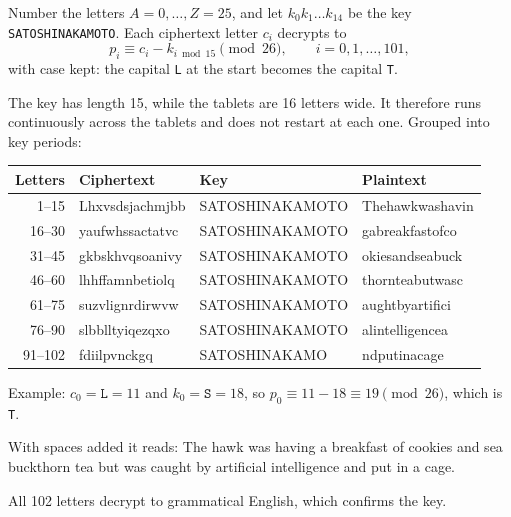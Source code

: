\documentclass[11pt,a4paper]{article}
\newcommand{\tx}[1]{\texttt{#1}}
\begin{document}
Number the letters $A=0,\dots,Z=25$, and let $k_0k_1\dots k_{14}$ be the key
\tx{SATOSHINAKAMOTO}. Each ciphertext letter $c_i$ decrypts to
\[
p_i \equiv c_i - k_{i \bmod 15} \pmod{26}, \qquad i=0,1,\dots,101,
\]
with case kept: the capital \tx{L} at the start becomes the capital \tx{T}.

The key has length 15, while the tablets are 16 letters wide. It therefore
runs continuously across the tablets and does not restart at each one.
Grouped into key periods:

\begin{center}
\renewcommand{\arraystretch}{1.15}
\begin{tabular}{@{}r>{\ttfamily}l>{\ttfamily}l>{\ttfamily}l@{}}
\toprule
Letters & \normalfont Ciphertext & \normalfont Key & \normalfont Plaintext \\
\midrule
1--15   & Lhxvsdsjachmjbb & SATOSHINAKAMOTO & Thehawkwashavin \\
16--30  & yaufwhssactatvc & SATOSHINAKAMOTO & gabreakfastofco \\
31--45  & gkbskhvqsoanivy & SATOSHINAKAMOTO & okiesandseabuck \\
46--60  & lhhffamnbetiolq & SATOSHINAKAMOTO & thornteabutwasc \\
61--75  & suzvlignrdirwvw & SATOSHINAKAMOTO & aughtbyartifici \\
76--90  & slbblltyiqezqxo & SATOSHINAKAMOTO & alintelligencea \\
91--102 & fdiilpvnckgq    & SATOSHINAKAMO   & ndputinacage \\
\bottomrule
\end{tabular}
\end{center}

\noindent
Example: $c_0=\tx{L}=11$ and $k_0=\tx{S}=18$, so $p_0\equiv 11-18\equiv 19
\pmod{26}$, which is \tx{T}.


\noindent
With spaces added it reads:
The hawk was having a breakfast of cookies and sea buckthorn tea but was
caught by artificial intelligence and put in a cage.

All 102 letters decrypt to grammatical English, which confirms the key.
\end{document}
